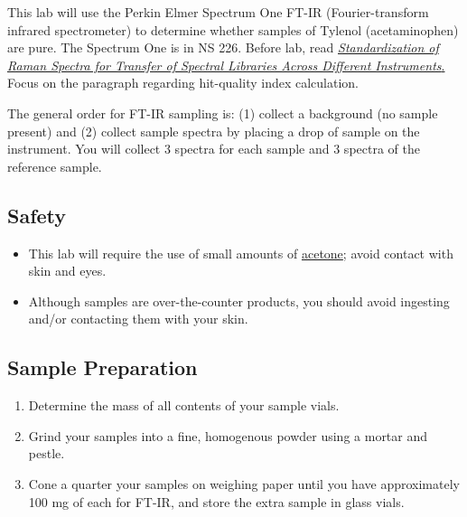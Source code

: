 \documentclass[]{tufte-book}
\providecommand{\tightlist}{%
  \setlength{\itemsep}{0pt}\setlength{\parskip}{0pt}}
\begin{document}
This lab will use the Perkin Elmer Spectrum One FT-IR (Fourier-transform infrared spectrometer) to determine whether samples of Tylenol (acetaminophen) are pure. The Spectrum One is in NS 226. Before lab, read \href{https://www.researchgate.net/publication/51602215_Standardization_of_Raman_spectra_for_transfer_of_spectral_libraries_across_different_instruments}{\emph{Standardization of Raman Spectra for Transfer of Spectral Libraries Across Different Instruments}.} Focus on the paragraph regarding hit-quality index calculation.

The general order for FT-IR sampling is: (1) collect a background (no sample present) and (2) collect sample spectra by placing a drop of sample on the instrument. You will collect 3 spectra for each sample and 3 spectra of the reference sample.

\hypertarget{safety-1}{%
\subsection*{Safety}\label{safety-1}}

\begin{itemize}
\tightlist
\item
  This lab will require the use of small amounts of \href{http://www.sciencelab.com/msds.php?msdsId=9927062}{acetone}; avoid contact with skin and eyes.
\item
  Although samples are over-the-counter products, you should avoid ingesting and/or contacting them with your skin.
\end{itemize}

\hypertarget{sample-preparation-1}{%
\subsection{Sample Preparation}\label{sample-preparation-1}}

\begin{enumerate}
\def\labelenumi{\arabic{enumi}.}
\tightlist
\item
  Determine the mass of all contents of your sample vials.
\item
  Grind your samples into a fine, homogenous powder using a mortar and pestle.
\item
  Cone a quarter your samples on weighing paper until you have approximately 100 mg of each for FT-IR, and store the extra sample in glass vials.
\end{enumerate}
\end{document}

